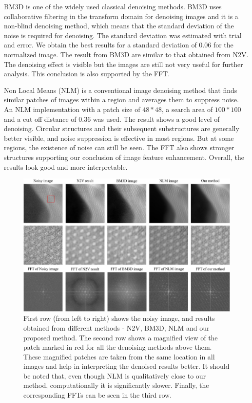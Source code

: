 \documentclass[fleqn,10pt]{wlscirep}
\begin{document}
	BM3D \cite{DBLP:journals/tip/BM3D} is one of the widely used classical denoising methods. BM3D uses collaborative filtering in the transform domain for denoising images and it is a non-blind denoising method, which means that the standard deviation of the noise is required for denoising. The standard deviation was estimated with trial and error. We obtain the best results for a standard deviation of 0.06 for the normalized image. The result from BM3D are similar to that obtained from N2V. The denoising effect is visible but the images are still not very useful for further analysis. This conclusion is also supported by the FFT.
	
		
	Non Local Means (NLM) \cite{bcm_nlm} is a conventional image denoising method that finds similar patches of images within a region and averages them to suppress noise. An NLM implementation with a patch size of $48*48$, a search area of $100*100$ and a cut off distance of 0.36 was used. The result shows a good level of denoising. Circular structures and their subsequent substructures are generally better visible, and noise suppression is effective in most regions. But at some regions, the existence of noise can still be seen. The FFT also shows stronger structures supporting our conclusion of image feature enhancement. Overall, the results look good and more interpretable. 
	
	\begin{figure}
		\centering
		\includegraphics[scale=0.4]{./imgs/comparison-zoomed.jpg}
		\caption{First row (from left to right) shows the noisy image, and results obtained from different methods - N2V, BM3D, NLM and our proposed method. The second row shows a magnified view of the patch marked in red for all the denoising methods above them. These magnified patches are taken from the same location in all images and help in interpreting the denoised results better. It should be noted that, even though NLM is qualitatively close to our method, computationally it is significantly slower. Finally, the corresponding FFTs can be seen in the third row.  }
		\label{fig:comparison}
	\end{figure}
		
\end{document}
